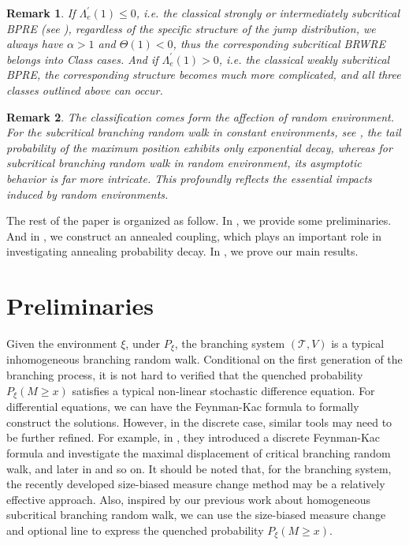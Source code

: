 \documentclass[]{article}
\numberwithin{equation}{section}
\theoremstyle{thmstyleone}%
\theoremstyle{thmstyletwo}%
\newtheorem{remark}{Remark}%
\theoremstyle{thmstylethree}%
\theoremstyle{thmstylefour}%
\theoremstyle{thmstylefive}%
\theoremstyle{thmstylesix}%
\begin{document}
	\begin{remark}
		If $ \Lambda_e^\prime(1)\leqslant 0 $, i.e. the classical strongly or intermediately subcritical BPRE (see \cite{B2}), regardless of the specific structure of the jump distribution, we always have $\alpha>1$ and $\varTheta(1)<0$, thus the corresponding subcritical BRWRE belongs into Class  cases.
		And if $ \Lambda_e^\prime(1)>0 $, i.e. the classical weakly subcritical BPRE, the corresponding structure becomes much more complicated, and all three classes outlined above can occur.
	\end{remark}
	
	\begin{remark}
		The classification comes form the affection of random environment. For the subcritical branching random walk in constant environments, see \cite{Neuman2017,Fu2025}, the tail probability of the maximum position exhibits only exponential decay, whereas for subcritical branching random walk in random environment, its asymptotic behavior is far more intricate. This profoundly reflects the essential impacts induced by random environments.
	\end{remark}
	

	The rest of the paper is organized as follow.
	In , we provide some preliminaries.
	And in , we construct an annealed coupling, which plays an important role in investigating annealing probability decay. In , we prove our main results.
	
	\section{Preliminaries}\label{Section2}
	
	Given the environment $ \xi$, under $P_\xi$, the branching system $(\mathcal{T},V)$ is a typical inhomogeneous branching random walk. Conditional on the first generation of the branching process, it is not hard to verified that the quenched probability $P_\xi(M\geqslant x)$ satisfies a typical non-linear stochastic difference equation. For differential equations, we can have the Feynman-Kac formula to formally construct the solutions. However, in the discrete case, similar tools may need to be further refined. For example, in \cite{Lalley2015}, they introduced a discrete Feynman-Kac formula and investigate the maximal displacement of critical branching random walk, and later in \cite{Neuman2017} and so on.
	It should be noted that,
	for the branching system, the recently developed size-biased measure change method may be a relatively effective approach. Also, inspired by our previous work \cite{Fu2025} about homogeneous subcritical branching random walk, we can use the size-biased measure change and optional line to express the quenched probability $P_\xi(M\geqslant x)$.
	
\end{document}
